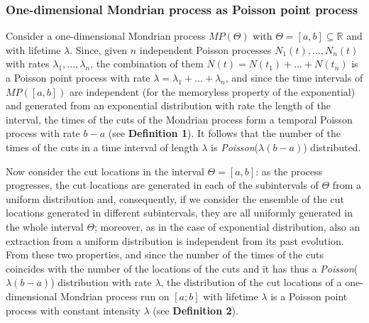 \documentclass[a4paper]{article}
\begin{document}

\subsubsection*{One-dimensional Mondrian process as Poisson point process}


Consider a one-dimensional Mondrian process $MP(\Theta)$ with $\Theta = [a,b] \subseteq \mathbb{R}$ and with lifetime $\lambda$.
Since, given $n$ independent Poisson processes $N_1(t),...,N_n(t)$ with rates $\lambda_1,...,\lambda_n$, the combination of them $N(t) = N(t_1) + ... + N(t_n)$ is a Poisson point process with rate $\lambda = \lambda_1 + ... + \lambda_n$, 
and since the time intervals of $MP([a,b])$ are independent (for the memoryless property of the exponential) and generated from an exponential distribution with rate the length of the interval,
the times of the cuts of the Mondrian process form a temporal Poisson process with rate $b-a$ (see  \textbf{Definition 1}).
It follows that the number of the times of the cuts in a time interval of length $\lambda$ is \emph{Poisson}($\lambda (b-a)$) distributed.

Now consider the cut locations in the interval $\Theta=[a,b]$: as the process progresses, the cut locations are generated in each of the subintervals of $\Theta$ from a uniform distribution and, consequently, if we consider the ensemble of the cut locations generated in different subintervals, they are all uniformly generated in the whole interval $\Theta$;
moreover, as in the case of exponential distribution, also an extraction from a uniform distribution is independent from its past evolution.
From these two properties, and since the number of the times of the cuts coincides with the number of the locations of the cuts and it has thus a \emph{Poisson}($\lambda (b-a)$) distribution with rate $\lambda$, 
the distribution of the cut locations of a one-dimensional Mondrian process run on $[a; b]$ with lifetime $\lambda$ is a Poisson point process with constant intensity $\lambda$ (see \textbf{Definition 2}).
\end{document}
